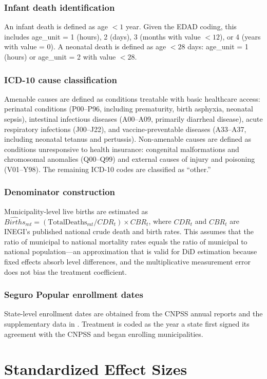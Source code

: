 \documentclass[12pt]{article}
\begin{document}
\subsubsection*{Infant death identification} An infant death is defined as age $< 1$ year. Given the EDAD coding, this includes age\_unit = 1 (hours), 2 (days), 3 (months with value $< 12$), or 4 (years with value = 0). A neonatal death is defined as age $< 28$ days: age\_unit = 1 (hours) or age\_unit = 2 with value $< 28$.

\subsubsection*{ICD-10 cause classification} Amenable causes are defined as conditions treatable with basic healthcare access: perinatal conditions (P00--P96, including prematurity, birth asphyxia, neonatal sepsis), intestinal infectious diseases (A00--A09, primarily diarrheal disease), acute respiratory infections (J00--J22), and vaccine-preventable diseases (A33--A37, including neonatal tetanus and pertussis). Non-amenable causes are defined as conditions unresponsive to health insurance: congenital malformations and chromosomal anomalies (Q00--Q99) and external causes of injury and poisoning (V01--Y98). The remaining ICD-10 codes are classified as ``other.''

\subsubsection*{Denominator construction} Municipality-level live births are estimated as $\hat{Births}_{mt} = (\text{TotalDeaths}_{mt} / CDR_t) \times CBR_t$, where $CDR_t$ and $CBR_t$ are INEGI's published national crude death and birth rates. This assumes that the ratio of municipal to national mortality rates equals the ratio of municipal to national population---an approximation that is valid for DiD estimation because fixed effects absorb level differences, and the multiplicative measurement error does not bias the treatment coefficient.

\subsubsection*{Seguro Popular enrollment dates} State-level enrollment dates are obtained from the CNPSS annual reports and the supplementary data in \citet{pfutze2014}. Treatment is coded as the year a state first signed its agreement with the CNPSS and began enrolling municipalities.

\section{Standardized Effect Sizes}
\label{sec:sde}


\end{document}

